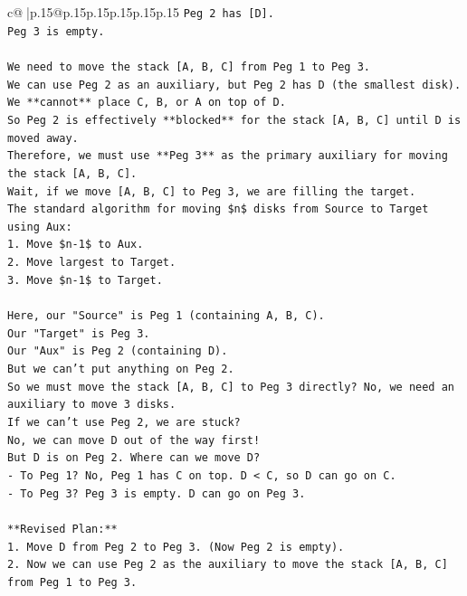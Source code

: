 \documentclass{article}
\begin{document}
{\begin{supertabular}{c@{$\;$}|p{.15\linewidth}@{}p{.15\linewidth}p{.15\linewidth}p{.15\linewidth}p{.15\linewidth}p{.15\linewidth}}
{{{\texttt{Peg 2 has {[}D{]}.} \\
\texttt{Peg 3 is empty.} \\
\\ 
\texttt{We need to move the stack {[}A, B, C{]} from Peg 1 to Peg 3.} \\
\texttt{We can use Peg 2 as an auxiliary, but Peg 2 has D (the smallest disk).} \\
\texttt{We **cannot** place C, B, or A on top of D.} \\
\texttt{So Peg 2 is effectively **blocked** for the stack {[}A, B, C{]} until D is moved away.} \\
\texttt{Therefore, we must use **Peg 3** as the primary auxiliary for moving the stack {[}A, B, C{]}.} \\
\texttt{Wait, if we move {[}A, B, C{]} to Peg 3, we are filling the target.} \\
\texttt{The standard algorithm for moving \$n\$ disks from Source to Target using Aux:} \\
\texttt{1. Move \$n{-}1\$ to Aux.} \\
\texttt{2. Move largest to Target.} \\
\texttt{3. Move \$n{-}1\$ to Target.} \\
\\ 
\texttt{Here, our "Source" is Peg 1 (containing A, B, C).} \\
\texttt{Our "Target" is Peg 3.} \\
\texttt{Our "Aux" is Peg 2 (containing D).} \\
\texttt{But we can't put anything on Peg 2.} \\
\texttt{So we must move the stack {[}A, B, C{]} to Peg 3 directly? No, we need an auxiliary to move 3 disks.} \\
\texttt{If we can't use Peg 2, we are stuck?} \\
\texttt{No, we can move D out of the way first!} \\
\texttt{But D is on Peg 2. Where can we move D?} \\
\texttt{{-} To Peg 1? No, Peg 1 has C on top. D < C, so D can go on C.} \\
\texttt{{-} To Peg 3? Peg 3 is empty. D can go on Peg 3.} \\
\\ 
\texttt{**Revised Plan:**} \\
\texttt{1. Move D from Peg 2 to Peg 3. (Now Peg 2 is empty).} \\
\texttt{2. Now we can use Peg 2 as the auxiliary to move the stack {[}A, B, C{]} from Peg 1 to Peg 3.} \\
}}}
\end{supertabular}}
\end{document}
